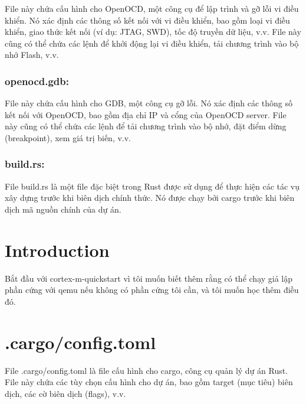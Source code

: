 \documentclass[
  letterpaper,
  DIV=11,
  numbers=noendperiod]{scrreprt}
\begin{document}
File này chứa cấu hình cho OpenOCD, một công cụ để lập trình và gỡ lỗi
vi điều khiển. Nó xác định các thông số kết nối với vi điều khiển, bao
gồm loại vi điều khiển, giao thức kết nối (ví dụ: JTAG, SWD), tốc độ
truyền dữ liệu, v.v. File này cũng có thể chứa các lệnh để khởi động lại
vi điều khiển, tải chương trình vào bộ nhớ Flash, v.v.

\subsection{openocd.gdb:}\label{openocd.gdb}

File này chứa cấu hình cho GDB, một công cụ gỡ lỗi. Nó xác định các
thông số kết nối với OpenOCD, bao gồm địa chỉ IP và cổng của OpenOCD
server. File này cũng có thể chứa các lệnh để tải chương trình vào bộ
nhớ, đặt điểm dừng (breakpoint), xem giá trị biến, v.v.

\subsection{build.rs:}\label{build.rs}

File build.rs là một file đặc biệt trong Rust được sử dụng để thực hiện
các tác vụ xây dựng trước khi biên dịch chính thức. Nó được chạy bởi
cargo trước khi biên dịch mã nguồn chính của dự án.


\chapter*{Introduction}\label{introduction}


Bắt đầu với cortex-m-quickstart vì tôi muốn biết thêm rằng có thể chạy
giả lập phần cứng với qemu nếu không có phần cứng tôi cần, và tôi muốn
học thêm điều đó.


\chapter{.cargo/config.toml}\label{cargoconfig.toml-1}

File .cargo/config.toml là file cấu hình cho cargo, công cụ quản lý dự
án Rust. File này chứa các tùy chọn cấu hình cho dự án, bao gồm target
(mục tiêu) biên dịch, các cờ biên dịch (flags), v.v.
\end{document}
